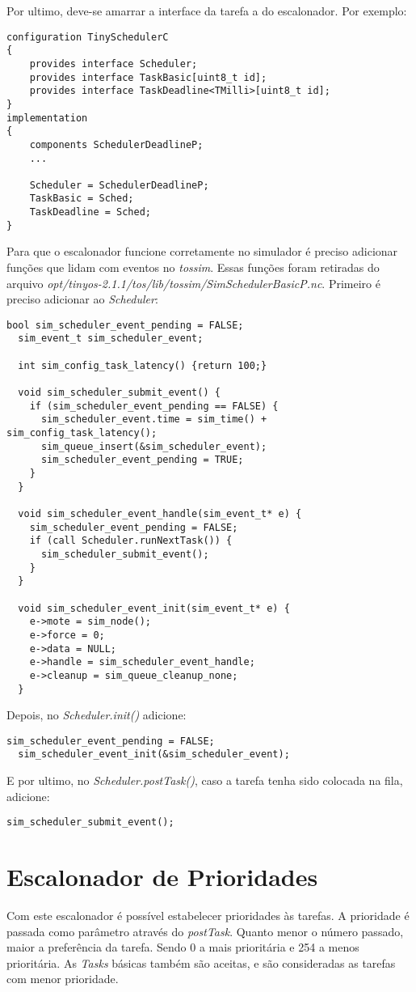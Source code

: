 \documentclass[a4paper,onecolumn, 10pt]{article}
\begin{document}
Por ultimo, deve-se amarrar a interface da tarefa a do escalonador. Por exemplo:
\begin{lstlisting}
configuration TinySchedulerC 
{
    provides interface Scheduler;
    provides interface TaskBasic[uint8_t id];
    provides interface TaskDeadline<TMilli>[uint8_t id];
}
implementation 
{
    components SchedulerDeadlineP;
    ...

    Scheduler = SchedulerDeadlineP;
    TaskBasic = Sched;
    TaskDeadline = Sched;
}
\end{lstlisting}

Para que o escalonador funcione corretamente no simulador é preciso adicionar funções que lidam com eventos no
\textit{tossim}. Essas funções foram retiradas do arquivo
\textit{opt/tinyos-2.1.1/tos/lib/tossim/SimSchedulerBasicP.nc}.
Primeiro é preciso adicionar ao \textit{Scheduler}:
\begin{lstlisting}[frame=single]
  bool sim_scheduler_event_pending = FALSE;
  sim_event_t sim_scheduler_event;

  int sim_config_task_latency() {return 100;}
  
  void sim_scheduler_submit_event() {
    if (sim_scheduler_event_pending == FALSE) {
      sim_scheduler_event.time = sim_time() + sim_config_task_latency();
      sim_queue_insert(&sim_scheduler_event);
      sim_scheduler_event_pending = TRUE;
    }
  }

  void sim_scheduler_event_handle(sim_event_t* e) {
    sim_scheduler_event_pending = FALSE;
    if (call Scheduler.runNextTask()) {
      sim_scheduler_submit_event();
    }
  }

  void sim_scheduler_event_init(sim_event_t* e) {
    e->mote = sim_node();
    e->force = 0;
    e->data = NULL;
    e->handle = sim_scheduler_event_handle;
    e->cleanup = sim_queue_cleanup_none;
  }
\end{lstlisting}
Depois, no \textit{Scheduler.init()} adicione:
\begin{lstlisting}[frame=single]
  sim_scheduler_event_pending = FALSE;
  sim_scheduler_event_init(&sim_scheduler_event);
\end{lstlisting}
E por ultimo, no \textit{Scheduler.postTask()}, caso a tarefa tenha sido colocada na fila, adicione:
\begin{lstlisting}[frame=single]
  sim_scheduler_submit_event();
\end{lstlisting}



\section{Escalonador de Prioridades}\label{escalonadorprioridades}
Com este escalonador é possível estabelecer prioridades às tarefas. A prioridade é passada como parâmetro através 
do \textit{postTask}. Quanto menor o número passado, maior a preferência da tarefa. Sendo 0 a
mais prioritária e 254 a menos prioritária.
As \textit{Tasks} básicas também são aceitas, e são consideradas as tarefas com menor prioridade.
\end{document}
